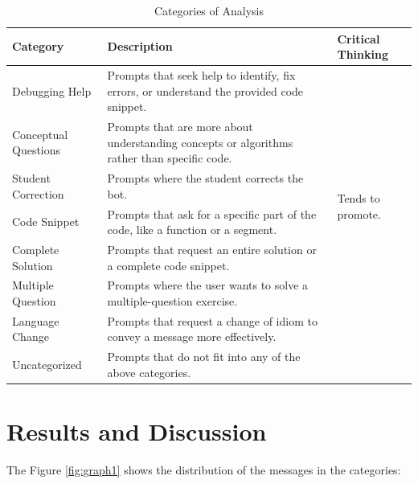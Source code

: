 \documentclass[a4paper,twoside]{article}
\begin{document}
\begin{table}[htbp]
  \caption{Categories of Analysis}
      \begin{center}
      \begin{tabular}{|p{4cm}|p{6cm}|p{3cm}|}
      \hline
      \textbf{Category} & \textbf{Description} & \textbf{Critical Thinking} \\
      \hline
      Debugging Help & Prompts that seek help to identify, fix errors, or understand the provided code snippet. & \multirow{7}{3cm}{Tends to promote.} \\
      Conceptual Questions & Prompts that are more about understanding concepts or algorithms rather than specific code. & \\
      Student Correction & Prompts where the student corrects the bot. & \\
      \hline
      Code Snippet & Prompts that ask for a specific part of the code, like a function or a segment. & \multirow{6}{3cm}{Tends not to promote.} \\
      Complete Solution & Prompts that request an entire solution or a complete code snippet. & \\
      Multiple Question & Prompts where the user wants to solve a multiple-question exercise. & \\
      \hline
      Language Change & Prompts that request a change of idiom to convey a message more effectively. & \multirow{4}{3cm}{Neutral.} \\
      Uncategorized & Prompts that do not fit into any of the above categories. & \\
      \hline
      \end{tabular}
      \label{tab:categories}
      \end{center}
  \end{table}

\section{Results and Discussion}

The Figure \ref{fig:graph1} shows the distribution of the messages in the
categories:
\end{document}
